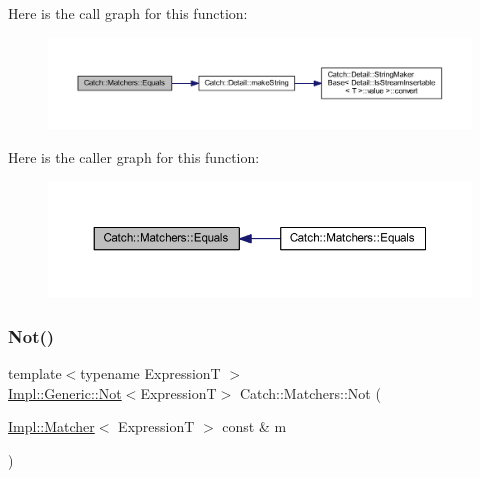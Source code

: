 Here is the call graph for this function\+:\nopagebreak
\begin{figure}[H]
\begin{center}
\leavevmode
\includegraphics[width=350pt]{namespace_catch_1_1_matchers_a7454444261cc4af7ee0b0bc82cf74284_cgraph}
\end{center}
\end{figure}
Here is the caller graph for this function\+:\nopagebreak
\begin{figure}[H]
\begin{center}
\leavevmode
\includegraphics[width=350pt]{namespace_catch_1_1_matchers_a7454444261cc4af7ee0b0bc82cf74284_icgraph}
\end{center}
\end{figure}
\hypertarget{namespace_catch_1_1_matchers_ae3c192dc15c973c38f07376d4debdc34}{}\label{namespace_catch_1_1_matchers_ae3c192dc15c973c38f07376d4debdc34} 
\subsubsection{\texorpdfstring{Not()}{Not()}}
{\footnotesize\ttfamily template$<$typename ExpressionT $>$ \\
\hyperlink{class_catch_1_1_matchers_1_1_impl_1_1_generic_1_1_not}{Impl\+::\+Generic\+::\+Not}$<$ExpressionT$>$ Catch\+::\+Matchers\+::\+Not (\begin{DoxyParamCaption}\item[{\hyperlink{struct_catch_1_1_matchers_1_1_impl_1_1_matcher}{Impl\+::\+Matcher}$<$ ExpressionT $>$ const \&}]{m }\end{DoxyParamCaption})\hspace{0.3cm}{\ttfamily [inline]}}

